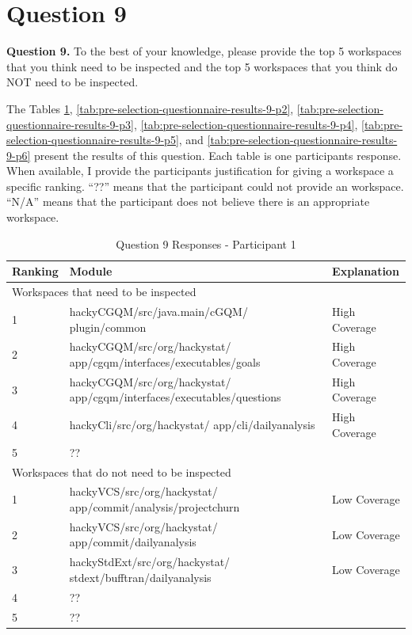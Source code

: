 \clearpage
\section{Question 9}
\label{appendix:section:question9}
\noindent \textbf{Question 9.} To the best of your knowledge, please
provide the top 5 workspaces that you think need to be inspected and the
top 5 workspaces that you think do NOT need to be inspected.

The Tables \ref{tab:pre-selection-questionnaire-results-9-p1},
\ref{tab:pre-selection-questionnaire-results-9-p2},
\ref{tab:pre-selection-questionnaire-results-9-p3},
\ref{tab:pre-selection-questionnaire-results-9-p4},
\ref{tab:pre-selection-questionnaire-results-9-p5}, and
\ref{tab:pre-selection-questionnaire-results-9-p6} present the results of
this question. Each table is one participants response. When available, I
provide the participants justification for giving a workspace a specific
ranking. ``??''  means that the participant could not provide an workspace.
``N/A'' means that the participant does not believe there is an appropriate
workspace.


\begin{table}[!h]
  \begin{center}
    \caption{Question 9 Responses - Participant 1}
    \label{tab:pre-selection-questionnaire-results-9-p1}
    \begin{tabular}{|p{2.0cm}|p{7.0cm}|p{4.0cm}|} \hline
{\bf Ranking} & {\bf Module} & {\bf Explanation} \\ \hline
\multicolumn{3}{|p{13.0cm}|}{Workspaces that need to be inspected} \\ \hline
1 & hackyCGQM/src/java.main/cGQM/ plugin/common & High Coverage \\ \hline
2 & hackyCGQM/src/org/hackystat/ app/cgqm/interfaces/executables/goals &
High Coverage \\ \hline 
3 & hackyCGQM/src/org/hackystat/ app/cgqm/interfaces/executables/questions
& High Coverage\\ \hline 
4 & hackyCli/src/org/hackystat/ app/cli/dailyanalysis & High Coverage \\ \hline
5 & ?? & \\ \hline
\multicolumn{3}{|p{13.0cm}|}{Workspaces that do not need to be inspected} \\ \hline
1 & hackyVCS/src/org/hackystat/ app/commit/analysis/projectchurn & Low Coverage \\ \hline
2 & hackyVCS/src/org/hackystat/ app/commit/dailyanalysis & Low Coverage \\ \hline
3 & hackyStdExt/src/org/hackystat/ stdext/bufftran/dailyanalysis & Low Coverage \\ \hline
4 & ?? & \\ \hline
5 & ?? & \\ \hline
    \end{tabular}
  \end{center}
\end{table}


